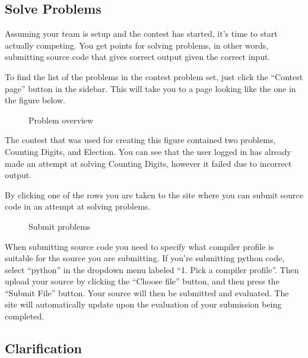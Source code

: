 \bigskip

\subsection{Solve Problems}

Assuming your team is setup and the contest has started,
it{\textquoteright}s time to start actually competing. You get points
for solving problems, in other words, submitting source code that gives
correct output given the correct input.


To find the list of the problems in the contest problem set, just click
the {\textquotedblleft}Contest page{\textquotedblright} button in the
sidebar. This will take you to a page looking like the one in the
figure below.


\begin{figure}
\centering
 \caption{Problem overview}
 \label{fig:problemOverview}
\end{figure}

The contest that was used for creating this figure contained two
problems, Counting Digits, and Election. You can see that the user
logged in has already made an attempt at solving Counting Digits,
however it failed due to incorrect output. 


\bigskip

By clicking one of the rows you are taken to the site where you can
submit source code in an attempt at solving problems. 

\begin{figure}
\centering
 \caption{Submit problems}
 \label{fig:submitProblem}
\end{figure}

When submitting source code you need to specify what compiler profile is
suitable for the source you are submitting. If you{\textquoteright}re
submitting python code, select
{\textquotedblleft}python{\textquotedblright} in the dropdown menu
labeled {\textquotedblleft}1. Pick a compiler
profile{\textquotedblright}. Then upload your source by clicking the
{\textquotedblleft}Choose file{\textquotedblright} button, and then
press the {\textquotedblleft}Submit File{\textquotedblright} button.
Your source will then be submitted and evaluated. The site will
automatically update upon the evaluation of your submission being
completed. \ 

\subsection{Clarification}

